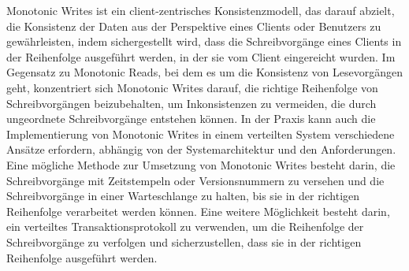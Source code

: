 \documentclass[../vs-script-first-v01.tex]{subfiles}
\begin{document}
Monotonic Writes ist ein client-zentrisches Konsistenzmodell, das darauf abzielt, die Konsistenz der Daten aus der Perspektive eines Clients oder Benutzers zu gewährleisten, indem sichergestellt wird, dass die Schreibvorgänge eines Clients in der Reihenfolge ausgeführt werden, in der sie vom Client eingereicht wurden. Im Gegensatz zu Monotonic Reads, bei dem es um die Konsistenz von Lesevorgängen geht, konzentriert sich Monotonic Writes darauf, die richtige Reihenfolge von Schreibvorgängen beizubehalten, um Inkonsistenzen zu vermeiden, die durch ungeordnete Schreibvorgänge entstehen können.
In der Praxis kann auch die Implementierung von Monotonic Writes in einem verteilten System verschiedene Ansätze erfordern, abhängig von der Systemarchitektur und den Anforderungen. Eine mögliche Methode zur Umsetzung von Monotonic Writes besteht darin, die Schreibvorgänge mit Zeitstempeln oder Versionsnummern zu versehen und die Schreibvorgänge in einer Warteschlange zu halten, bis sie in der richtigen Reihenfolge verarbeitet werden können. Eine weitere Möglichkeit besteht darin, ein verteiltes Transaktionsprotokoll zu verwenden, um die Reihenfolge der Schreibvorgänge zu verfolgen und sicherzustellen, dass sie in der richtigen Reihenfolge ausgeführt werden.
\end{document}
